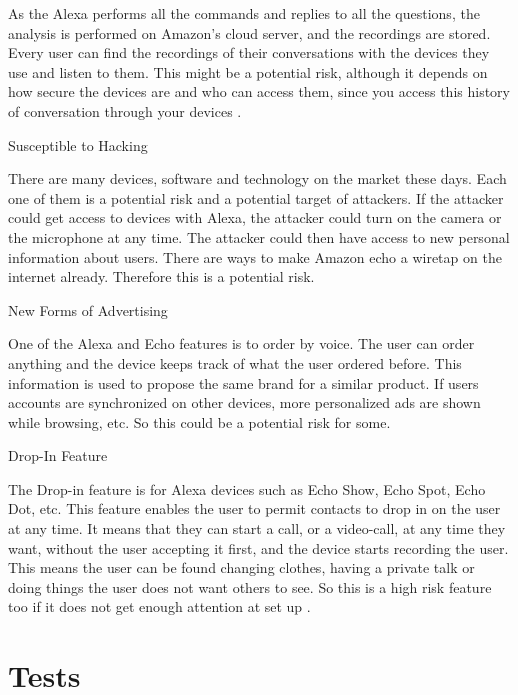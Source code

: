 \documentclass[
  digital, %
  oneside, %
  table,   %
  lof,     %
  lot,     %
]{fithesis3}
\begin{document}
\begin{compactitem}
As the Alexa performs all the commands and replies to all the questions, the analysis is performed on Amazon's cloud server, and the recordings are stored. Every user can find the recordings of their conversations with the devices they use and listen to them. This might be a potential risk, although it depends on how secure the devices are and who can access them, since you access this history of conversation through your devices \parencite{alexa_risks}.
  
  \item Susceptible to Hacking
  
There are many devices, software and technology on the market these days. Each one of them is a potential risk and a potential target of attackers. If the attacker could get access to devices with Alexa, the attacker could turn on the camera or the microphone at any time. The attacker could then have access to new personal information about users. There are ways to make Amazon echo a wiretap on the internet already. Therefore this is a potential risk.
  
  \item New Forms of Advertising
  
One of the Alexa and Echo features is to order by voice. The user can order anything and the device keeps track of what the user ordered before. This information is used to propose the same brand for a similar product. If users accounts are synchronized on other devices, more personalized ads are shown while browsing, etc. So this could be a potential risk for some.

 \item Drop-In Feature
  
The Drop-in feature is for Alexa devices such as Echo Show, Echo Spot, Echo Dot, etc. This feature enables the user to permit contacts to drop in on the user at any time. It means that they can start a call, or a video-call, at any time they want, without the user accepting it first, and the device starts recording the user. This means the user can be found changing clothes, having a private talk or doing things the user does not want others to see. So this is a high risk feature too if it does not get enough attention at set up \parencite{alexa_dropin}.

\end{compactitem}

\section{Tests}
\end{document}
